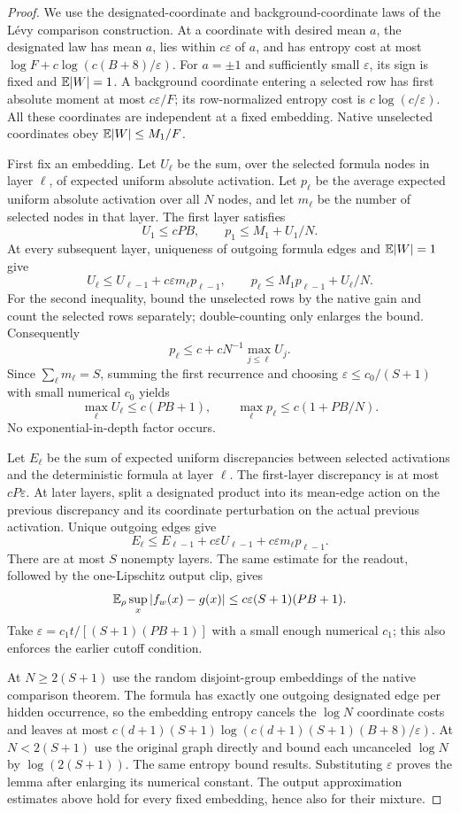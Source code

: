 \begin{proof}
We use the designated-coordinate and background-coordinate laws of the L\'evy comparison construction. At a coordinate with desired mean $a$, the designated law has mean $a$, lies within $c\varepsilon$ of $a$, and has entropy cost at most $\log F+c\log(c(B+8)/\varepsilon)$. For $a=\pm1$ and sufficiently small $\varepsilon$, its sign is fixed and $\mathbb E|W|=1$. A background coordinate entering a selected row has first absolute moment at most $c\varepsilon/F$; its row-normalized entropy cost is $c\log(c/\varepsilon)$. All these coordinates are independent at a fixed embedding. Native unselected coordinates obey $\mathbb E|W|\le M_1/F$.

First fix an embedding. Let $U_\ell$ be the sum, over the selected formula nodes in layer $\ell$, of expected uniform absolute activation. Let $p_\ell$ be the average expected uniform absolute activation over all $N$ nodes, and let $m_\ell$ be the number of selected nodes in that layer. The first layer satisfies
\[
 U_1\le cPB,\qquad p_1\le M_1+U_1/N.
\]
At every subsequent layer, uniqueness of outgoing formula edges and $\mathbb E|W|=1$ give
\[
 U_\ell\le U_{\ell-1}+c\varepsilon m_\ell p_{\ell-1},\qquad
 p_\ell\le M_1p_{\ell-1}+U_\ell/N.
\]
For the second inequality, bound the unselected rows by the native gain and count the selected rows separately; double-counting only enlarges the bound. Consequently
\[
 p_\ell\le c+cN^{-1}\max_{j\le\ell}U_j.
\]
Since $\sum_\ell m_\ell=S$, summing the first recurrence and choosing $\varepsilon\le c_0/(S+1)$ with small numerical $c_0$ yields
\[
 \max_\ell U_\ell\le c(PB+1),\qquad
 \max_\ell p_\ell\le c(1+PB/N).
\]
No exponential-in-depth factor occurs.

Let $E_\ell$ be the sum of expected uniform discrepancies between selected activations and the deterministic formula at layer $\ell$. The first-layer discrepancy is at most $cP\varepsilon$. At later layers, split a designated product into its mean-edge action on the previous discrepancy and its coordinate perturbation on the actual previous activation. Unique outgoing edges give
\[
 E_\ell\le E_{\ell-1}+c\varepsilon U_{\ell-1}
                     +c\varepsilon m_\ell p_{\ell-1}.
\]
There are at most $S$ nonempty layers. The same estimate for the readout, followed by the one-Lipschitz output clip, gives
\[
 \mathbb E_\rho\sup_x|f_w(x)-g(x)|
 \le c\varepsilon(S+1)(PB+1).
\]
Take $\varepsilon=c_1t/[(S+1)(PB+1)]$ with a small enough numerical $c_1$; this also enforces the earlier cutoff condition.

At $N\ge2(S+1)$ use the random disjoint-group embeddings of the native comparison theorem. The formula has exactly one outgoing designated edge per hidden occurrence, so the embedding entropy cancels the $\log N$ coordinate costs and leaves at most
$c(d+1)(S+1)\log(c(d+1)(S+1)(B+8)/\varepsilon)$.
At $N<2(S+1)$ use the original graph directly and bound each uncanceled $\log N$ by $\log(2(S+1))$. The same entropy bound results. Substituting $\varepsilon$ proves the lemma after enlarging its numerical constant. The output approximation estimates above hold for every fixed embedding, hence also for their mixture.
\end{proof}

